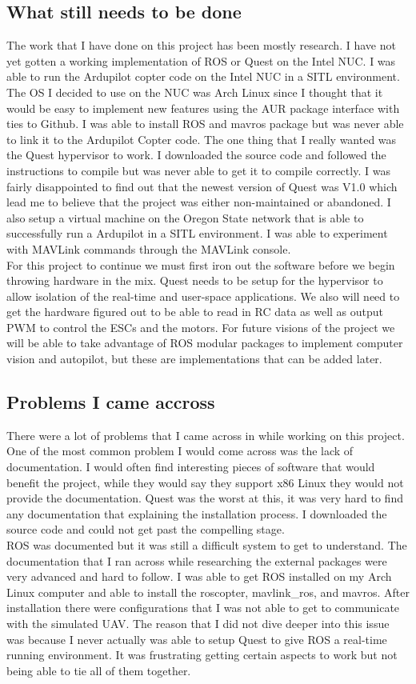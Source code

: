 \documentclass[letterpaper,10pt,notitlepage,fleqn]{article}
\begin{document}
\subsection{What still needs to be done}
\indent The work that I have done on this project has been mostly research. I have not yet gotten a working implementation of ROS or Quest on the Intel NUC. I was able to run the Ardupilot copter code on the Intel NUC in a SITL environment. The OS I decided to use on the NUC was Arch Linux since I thought that it would be easy to implement new features using the AUR package interface with ties to Github. I was able to install ROS and mavros package but was never able to link it to
the Ardupilot Copter code. The one thing that I really wanted was the Quest hypervisor to work. I downloaded the source code and followed the instructions to compile but was never able to get it to compile correctly. I was fairly disappointed to find out that the newest version of Quest was V1.0 which lead me to believe that the project was either non-maintained or abandoned. I also setup a virtual machine on the Oregon State network that is able to successfully run a
Ardupilot in a SITL environment. I was able to experiment with MAVLink commands through the MAVLink console. 
\\ 
\indent For this project to continue we must first iron out the software before we begin throwing hardware in the mix. Quest needs to be setup for the hypervisor to allow isolation of the real-time and user-space applications. We also will need to get the hardware figured out to be able to read in RC data as well as output PWM to control the ESCs and the motors. For future visions of the project we will be able to take advantage of ROS modular packages to implement computer vision
and autopilot, but these are implementations that can be added later.   

\subsection{Problems I came accross}
\indent There were a lot of problems that I came across in while working on this project. One of the most common problem I would come across was the lack of documentation. I would often find interesting pieces of software that would benefit the project, while they would say they support x86 Linux they would not provide the documentation. Quest was the worst at this, it was very hard to find any documentation that explaining the installation process. I downloaded the source
code and could not get past the compelling stage. 
\\
\indent ROS was documented but it was still a difficult system to get to understand. The documentation that I ran across while researching the external packages were very advanced and hard to follow. I was able to get ROS installed on my Arch Linux computer and able to install the roscopter, mavlink\_ros, and mavros. After installation there were configurations that I was not able to get to communicate with the simulated UAV. The reason that I did not dive deeper into this
issue was because I never actually was able to setup Quest to give ROS a real-time running environment. It was frustrating getting certain aspects to work but not being able to tie all of them together. 
\end{document}
